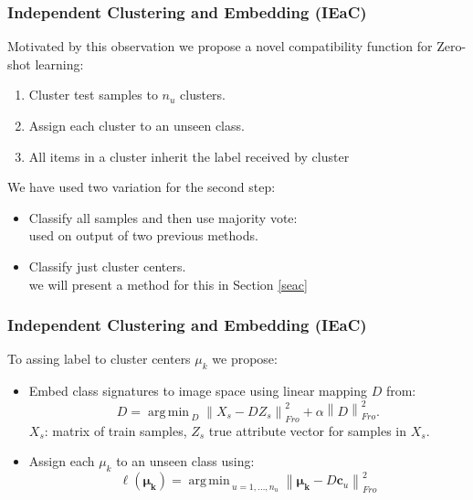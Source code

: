 \documentclass{beamer}
\DeclareMathOperator*{\argmin}{arg\,min\,}
\newcommand{\normf}[1]{\left \lVert #1 \right \rVert_{Fro}}
\begin{document}
\begin{frame}\frametitle{Independent Clustering and Embedding (IEaC)}
  Motivated by this observation we propose a novel compatibility function for Zero-shot learning:
  \begin{enumerate}
    \item Cluster test samples to $n_u$ clusters.
    \item Assign each cluster to an unseen class.
    \item All items in a cluster inherit the label received by cluster
  \end{enumerate}
  We have used two variation for the second step:
  \begin{itemize}
    \item Classify all samples and then use majority vote:
    \\ used on output of two previous methods.
    \item Classify just cluster centers.
    \\ we will present a method for this in Section \ref{seac}
  \end{itemize}
\end{frame}



\begin{frame}\frametitle{Independent Clustering and Embedding (IEaC)}
To assing label to cluster centers $\mu_k$ we propose:
\begin{itemize}
  \item Embed class signatures to image space using linear mapping $D$ from:
  \begin{equation} \label{eq:d_definition}
  D = \argmin_D \normf{X_s - D Z_s}^2 + \alpha \normf{D}^2.
\end{equation}
$X_s$: matrix of train samples, $Z_s$ true attribute vector for samples in $X_s.$
\item Assign each $\mu_k$ to an unseen class using:
\begin{equation}
\label{eq:simple_assignment}
\ell(\boldsymbol{\mu_k}) = \argmin_{u=1,\ldots,n_u} \normf{\boldsymbol{\mu_k} - D\mathbf{c}_{u}}^2
\end{equation}\end{itemize}
\end{frame}
\end{document}
